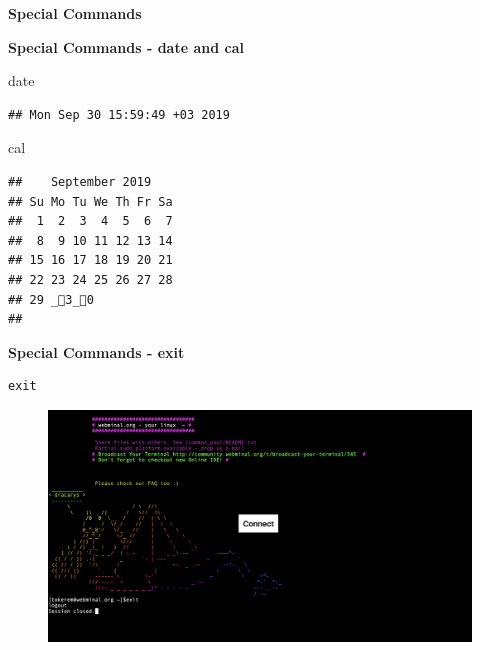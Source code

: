 \documentclass[ignorenonframetext,]{beamer}
\newenvironment{Shaded}{\begin{snugshade}}{\end{snugshade}}
\newcommand{\FunctionTok}[1]{\textcolor[rgb]{0.00,0.00,0.00}{#1}}
\begin{document}
\begin{frame}[fragile]{\textbf{Special Commands}}
\begin{block}{\textbf{Special Commands - {\textbf{date}} and
{\textbf{cal}}}}

\begin{Shaded}
\begin{Highlighting}[]
\FunctionTok{date}
\end{Highlighting}
\end{Shaded}

\begin{verbatim}
## Mon Sep 30 15:59:49 +03 2019
\end{verbatim}

\begin{Shaded}
\begin{Highlighting}[]
\FunctionTok{cal}
\end{Highlighting}
\end{Shaded}

\begin{verbatim}
##    September 2019     
## Su Mo Tu We Th Fr Sa  
##  1  2  3  4  5  6  7  
##  8  9 10 11 12 13 14  
## 15 16 17 18 19 20 21  
## 22 23 24 25 26 27 28  
## 29 _3_0                 
## 
\end{verbatim}

\end{block}

\begin{block}{\textbf{Special Commands - {\textbf{exit}}}}

\begin{verbatim}
exit
\end{verbatim}

\begin{figure}
\centering
\includegraphics{exit.png}
\caption{}
\end{figure}

\end{block}

\end{frame}
\end{document}

